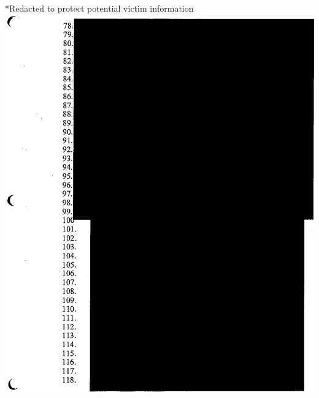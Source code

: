 \documentclass[10pt]{article}
\begin{document}
\begin{displayquote}
*Redacted to protect potential victim information\\
\includegraphics[max width=\textwidth, center]{2025_02_27_dd68c3d38de88f0516d9g-220}\\

\end{displayquote}
\end{document}
